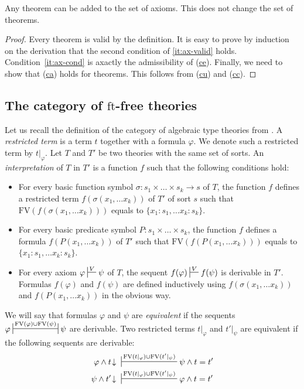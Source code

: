 \documentclass[reqno]{amsart}
\newcommand{\axref}[1]{(\hyperref[ax:#1]{#1})}
\theoremstyle{definition}
\theoremstyle{remark}
\newcommand{\fs}[1]{\mathrm{#1}}
\newcommand{\FV}{\fs{FV}}
\newcommand{\ft}{\fs{ft}}
\numberwithin{figure}{section}
\begin{document}
\begin{cor}
Any theorem can be added to the set of axioms.
This does not change the set of theorems.
\end{cor}
\begin{proof}
Every theorem is valid by the definition.
It is easy to prove by induction on the derivation that the second condition of \eqref{it:ax-valid} holds.
Condition~\eqref{it:ax-cond} is axactly the admissibility of \axref{ce}.
Finally, we need to show that \axref{ca} holds for theorems.
This follows from \axref{cu} and \axref{cc}.
\end{proof}

\subsection{The category of $\ft$-free theories}
\label{sec:types}

Let us recall the definition of the category of algebraic type theories from \cite{alg-tt}.
A \emph{restricted term} is a term $t$ together with a formula $\varphi$.
We denote such a restricted term by $t|_\varphi$.
Let $T$ and $T'$ be two theories with the same set of sorts.
An \emph{interpretation} of $T$ in $T'$ is a function $f$ such that the following conditions hold:
\begin{itemize}
\item For every basic function symbol $\sigma : s_1 \times \ldots \times s_k \to s$ of $T$,
the function $f$ defines a restricted term $f(\sigma(x_1, \ldots x_k))$ of $T'$ of sort $s$ such that $\FV(f(\sigma(x_1, \ldots x_k)))$ equals to $\{ x_1 : s_1, \ldots x_k : s_k \}$.
\item For every basic predicate symbol $P : s_1 \times \ldots \times s_k$,
the function $f$ defines a formula $f(P(x_1, \ldots x_k))$ of $T'$ such that $\FV(f(P(x_1, \ldots x_k)))$ equals to $\{ x_1 : s_1, \ldots x_k : s_k \}$.
\item For every axiom $\varphi \sststile{}{V} \psi$ of $T$, the sequent $f(\varphi) \sststile{}{V} f(\psi)$ is derivable in $T'$.
Formulas $f(\varphi)$ and $f(\psi)$ are defined inductively using $f(\sigma(x_1, \ldots x_k))$ and $f(P(x_1, \ldots x_k))$ in the obvious way.
\end{itemize}

We will say that formulas $\varphi$ and $\psi$ are \emph{equivalent} if the sequents $\varphi \ssststile{}{\FV(\varphi) \cup \FV(\psi)} \psi$ are derivable.
Two restricted terms $t|_\varphi$ and $t'|_\psi$ are equivalent if the following sequents are derivable:
\begin{align*}
\varphi \land t\!\downarrow\ & \sststile{}{\FV(t|_\varphi) \cup \FV(t'|_\psi)} \psi \land t = t' \\
\psi \land t'\!\downarrow\ & \sststile{}{\FV(t|_\varphi) \cup \FV(t'|_\psi)} \varphi \land t = t'
\end{align*}
\end{document}
